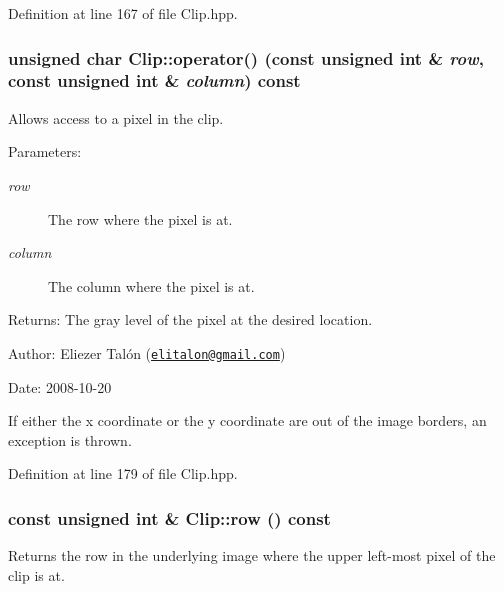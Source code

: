 Definition at line 167 of file Clip.hpp.\hypertarget{class_clip_16b24276181affc5086cb4fe83269fb8}{
\subsubsection[operator()]{\setlength{\rightskip}{0pt plus 5cm}unsigned char Clip::operator() (const unsigned int \& {\em row}, \/  const unsigned int \& {\em column}) const}}
\label{class_clip_16b24276181affc5086cb4fe83269fb8}


Allows access to a pixel in the clip. 

\begin{Desc}
\item[Parameters:]
\begin{description}
\item[{\em row}]The row where the pixel is at. \item[{\em column}]The column where the pixel is at.\end{description}
\end{Desc}
\begin{Desc}
\item[Returns:]The gray level of the pixel at the desired location.\end{Desc}
\begin{Desc}
\item[Author:]Eliezer Talón (\href{mailto:elitalon@gmail.com}{\tt elitalon@gmail.com}) \end{Desc}
\begin{Desc}
\item[Date:]2008-10-20\end{Desc}
If either the x coordinate or the y coordinate are out of the image borders, an exception is thrown. 

Definition at line 179 of file Clip.hpp.\hypertarget{class_clip_1a1d1fd626d1325f0f2b9184de4c89b8}{
\subsubsection[row]{\setlength{\rightskip}{0pt plus 5cm}const unsigned int \& Clip::row () const}}
\label{class_clip_1a1d1fd626d1325f0f2b9184de4c89b8}


Returns the row in the underlying image where the upper left-most pixel of the clip is at. 

